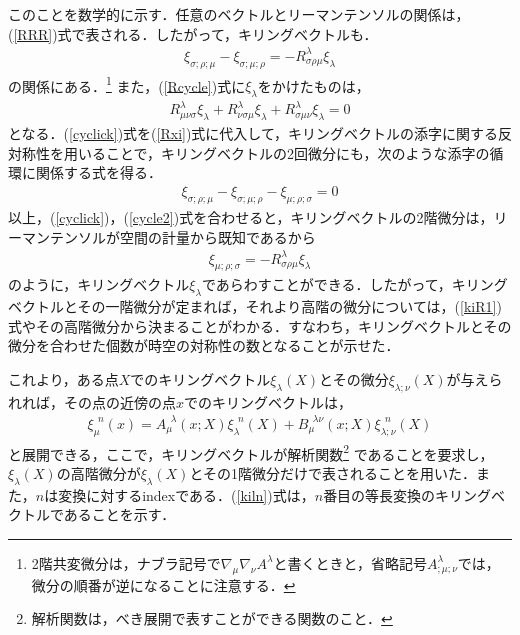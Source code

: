 このことを数学的に示す．任意のベクトルとリーマンテンソルの関係は，(\ref{RRR})式で表される．したがって，キリングベクトルも．
\begin{eqnarray}
\label{cyclick}
\xi_{\sigma;\rho;\mu}-\xi_{\sigma;\mu;\rho}=-R^{\lambda}_{\sigma\rho\mu}\xi_{\lambda}
\end{eqnarray}
の関係にある．\footnote{2階共変微分は，ナブラ記号で$\nabla_{\mu}\nabla_{\nu}A^{\lambda}$と書くときと，省略記号$A^{\lambda}_{;\mu;\nu}$では，微分の順番が逆になることに注意する．}
また，(\ref{Rcycle})式に$\xi_{\lambda}$をかけたものは，
\begin{eqnarray}
\label{Rxi}
R^{\lambda}_{\mu\nu\sigma}\xi_{\lambda}+R^{\lambda}_{\nu\sigma\mu}\xi_{\lambda}+R^{\lambda}_{\sigma\mu\nu}\xi_{\lambda}=0
\end{eqnarray}
となる．(\ref{cyclick})式を(\ref{Rxi})式に代入して，キリングベクトルの添字に関する反対称性を用いることで，キリングベクトルの2回微分にも，次のような添字の循環に関係する式を得る．
\begin{eqnarray}
\label{cycle2}
\xi_{\sigma;\rho;\mu}-\xi_{\sigma;\mu;\rho}-\xi_{\mu;\rho;\sigma}=0
\end{eqnarray}
以上，(\ref{cyclick})，(\ref{cycle2})式を合わせると，キリングベクトルの2階微分は，リーマンテンソルが空間の計量から既知であるから
\begin{eqnarray}
\label{kiR1}
\xi_{\mu;\rho;\sigma}=-R^{\lambda}_{\sigma\rho\mu}\xi_{\lambda}
\end{eqnarray}
のように，キリングベクトル$\xi_{\lambda}$であらわすことができる．したがって，キリングベクトルとその一階微分が定まれば，それより高階の微分については，(\ref{kiR1})式やその高階微分から決まることがわかる．すなわち，キリングベクトルとその微分を合わせた個数が時空の対称性の数となることが示せた．

これより，ある点$X$でのキリングベクトル$\xi_{\lambda}(X)$とその微分$\xi_{\lambda;\nu}(X)$が与えられれば，その点の近傍の点$x$でのキリングベクトルは，
\begin{eqnarray}
\label{kiln}
\xi_{\mu}^{\ \ n}(x)=A_{\mu}^{\ \ \lambda}(x;X)\xi_{\lambda}^{\ \ n}(X)+B_{\mu}^{\ \ \lambda\nu}(x;X)\xi_{\lambda;\nu}^{\ \ n}(X)
\end{eqnarray}
と展開できる，ここで，キリングベクトルが解析関数\footnote{解析関数は，べき展開で表すことができる関数のこと．}
であることを要求し，$\xi_{\lambda}(X)$の高階微分が$\xi_{\lambda}(X)$とその1階微分だけで表されることを用いた．また，$n$は変換に対するindexである．(\ref{kiln})式は，$n$番目の等長変換のキリングベクトルであることを示す．

